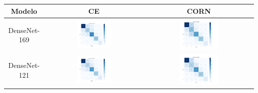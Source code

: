 \begin{table}[!htbp]
    \centering
    \begin{tabular}{|c|c|c|}
        \hline
        \textbf{Modelo} & \textbf{CE} & \textbf{CORN} \\ \hline
        DenseNet-169 & \includegraphics[width=0.37\textwidth]{figs/confusion_matrices/densenet169_cm_cross_entropy.png} & \includegraphics[width=0.37\textwidth]{figs/confusion_matrices/densenet169_cm_corn.png} \\ \hline
        DenseNet-121 & \includegraphics[width=0.37\textwidth]{figs/confusion_matrices/densenet121_cm_cross_entropy.png} & \includegraphics[width=0.37\textwidth]{figs/confusion_matrices/densenet121_cm_corn.png} \\ \hline

\end{tabular}
\end{table}
